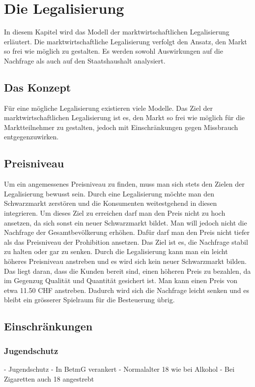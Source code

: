 \documentclass[../main.tex]{subfiles}
\begin{document}
	 \section{Die Legalisierung}
	 
	 In diesem Kapitel wird das Modell der marktwirtschaftlichen Legalisierung erläutert. 
	 Die marktwirtschaftliche Legalisierung verfolgt den Ansatz, den Markt so frei wie möglich zu gestalten. 
	 Es werden sowohl Auswirkungen auf die Nachfrage als auch auf den Staatshaushalt analysiert. 
	 
	 \subsection{Das Konzept}
	 Für eine mögliche Legalisierung existieren viele Modelle. 
	 Das Ziel der marktwirtschaftlichen Legalisierung ist es, den Markt so frei wie möglich für die Marktteilnehmer zu gestalten, jedoch mit Einschränkungen gegen Missbrauch entgegenzuwirken.
	 
	 \subsection{Preisniveau}
	 
	 Um ein angemessenes Preisniveau zu finden, muss man sich stets den Zielen der Legalisierung bewusst sein. 
	 Durch eine Legalisierung möchte man den Schwarzmarkt zerstören und die Konsumenten weitestgehend in diesen integrieren. 
	 Um dieses Ziel zu erreichen darf man den Preis nicht zu hoch ansetzen, da sich sonst ein neuer Schwarzmarkt bildet. 
	 Man will jedoch nicht die Nachfrage der Gesamtbevölkerung erhöhen. 
	 Dafür darf man den Preis nicht tiefer als das Preisniveau der Prohibition ansetzen. 
	 Das Ziel ist es, die Nachfrage stabil zu halten oder gar zu senken.
	 Durch die Legalisierung kann man ein leicht höheres Preisniveau anstreben und es wird sich kein neuer Schwarzmarkt bilden. 
	 Das liegt daran, dass die Kunden bereit sind, einen höheren Preis zu bezahlen, da im Gegenzug Qualität und Quantität gesichert ist. 
	 Man kann einen Preis von etwa 11.50 CHF anstreben. 
	 Dadurch wird sich die Nachfrage leicht senken und es bleibt ein grösserer Spielraum für die Besteuerung übrig.
	 
	 \subsection{Einschränkungen}
	 
	 \subsubsection{Jugendschutz}
	 - Jugendschutz
	 - In BetmG verankert
	 - Normalalter 18 wie bei Alkohol
	 - Bei Zigaretten auch 18 angestrebt
	  
\end{document}
